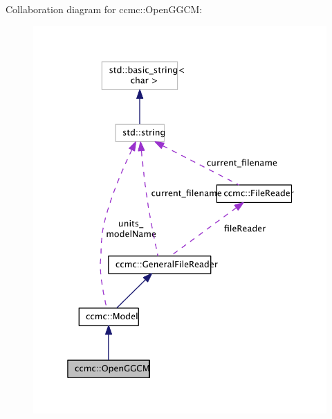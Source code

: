 Collaboration diagram for ccmc\-:\-:Open\-G\-G\-C\-M\-:\nopagebreak
\begin{figure}[H]
\begin{center}
\leavevmode
\includegraphics[width=338pt]{classccmc_1_1_open_g_g_c_m__coll__graph}
\end{center}
\end{figure}

